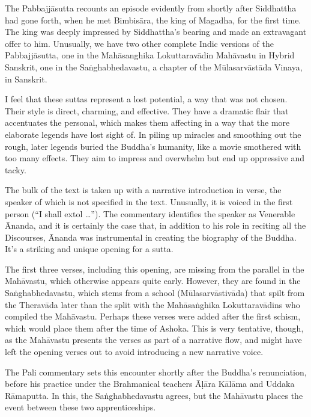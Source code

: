 \documentclass[12pt,openany]{book}%
\begin{document}
The \textsanskrit{Pabbajjāsutta} recounts an episode evidently from shortly after Siddhattha had gone forth, when he met \textsanskrit{Bimbisāra}, the king of Magadha, for the first time. The king was deeply impressed by Siddhattha’s bearing and made an extravagant offer to him. Unusually, we have two other complete Indic versions of the \textsanskrit{Pabbajjāsutta}, one in the \textsanskrit{Mahāsanghika} \textsanskrit{Lokuttaravādin} \textsanskrit{Mahāvastu} in Hybrid Sanskrit, one in the \textsanskrit{Saṅghabhedavastu}, a chapter of the \textsanskrit{Mūlasarvāstāda} Vinaya, in Sanskrit.

I feel that these suttas represent a lost potential, a way that was not chosen. Their style is direct, charming, and effective. They have a dramatic flair that accentuates the personal, which makes them affecting in a way that the more elaborate legends have lost sight of. In piling up miracles and smoothing out the rough, later legends buried the Buddha’s humanity, like a movie smothered with too many effects. They aim to impress and overwhelm but end up oppressive and tacky.

The bulk of the text is taken up with a narrative introduction in verse, the speaker of which is not specified in the text. Unusually, it is voiced in the first person (“I shall extol …”). The commentary identifies the speaker as Venerable Ānanda, and it is certainly the case that, in addition to his role in reciting all the Discourses, Ānanda was instrumental in creating the biography of the Buddha. It’s a striking and unique opening for a sutta.

The first three verses, including this opening, are missing from the parallel in the \textsanskrit{Mahāvastu}, which otherwise appears quite early. However, they are found in the \textsanskrit{Saṅghabhedavastu}, which stems from a school (\textsanskrit{Mūlasarvāstivāda}) that spilt from the \textsanskrit{Theravāda} later than the split with the \textsanskrit{Mahāsaṅghika} \textsanskrit{Lokuttaravādins} who compiled the \textsanskrit{Mahāvastu}. Perhaps these verses were added after the first schism, which would place them after the time of Ashoka. This is very tentative, though, as the \textsanskrit{Mahāvastu} presents the verses as part of a narrative flow, and might have left the opening verses out to avoid introducing a new narrative voice.

The Pali commentary sets this encounter shortly after the Buddha’s renunciation, before his practice under the Brahmanical teachers \textsanskrit{Āḷāra} \textsanskrit{Kālāma} and Uddaka \textsanskrit{Rāmaputta}. In this, the \textsanskrit{Saṅghabhedavastu} agrees, but the \textsanskrit{Mahāvastu} places the event between these two apprenticeships.
\end{document}
